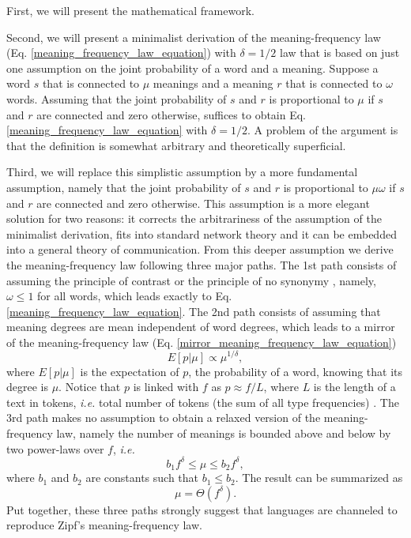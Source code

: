 \documentclass{article}
\begin{document}
First, we will present the mathematical framework. 

Second, we will present a minimalist derivation of the meaning-frequency law (Eq. \ref{meaning_frequency_law_equation}) with $\delta= 1/2$ law that is based on just one assumption on the joint probability of a word and a meaning. Suppose a word $s$ that is connected to $\mu$ meanings and a meaning $r$ that is connected to $\omega$ words.  Assuming that the joint probability of $s$ and $r$ is proportional to $\mu$ if $s$ and $r$ are connected and zero otherwise, suffices to obtain Eq. \ref{meaning_frequency_law_equation} with $\delta = 1/2$. A problem of the argument is that the definition is somewhat arbitrary and theoretically superficial. 

Third, we will replace 
this simplistic assumption by a more fundamental assumption, namely that the joint probability of $s$ and $r$ is proportional to $\mu\omega$ if $s$ and $r$ are connected and zero otherwise. This assumption is a more elegant solution for two reasons: it corrects the arbitrariness of the assumption of the minimalist derivation, fits into standard network theory and it can be embedded into a general theory of communication. From this deeper assumption we derive the meaning-frequency law following three major paths. The 1st path consists of assuming the principle of contrast \cite{Clark1987a} or the principle of no synonymy \cite[p. 67]{Goldberg1995}, namely, $\omega \leq 1$ for all words, which leads exactly to Eq. \ref{meaning_frequency_law_equation}. The 2nd path consists of assuming that meaning degrees are mean independent of word degrees, which leads to a mirror of the meaning-frequency law (Eq. \ref{mirror_meaning_frequency_law_equation}) 
\begin{equation}
E[p|\mu] \propto \mu^{1/\delta}, 
\label{mean_independence_law_equation}
\end{equation}
where $E[p|\mu]$ is the expectation of $p$, the probability of a word, knowing that its degree is $\mu$. Notice that $p$ is linked with $f$ as $p \approx f/L$, where $L$ is the length of a text in tokens, {\em i.e.} total number of tokens (the sum of all type frequencies) \cite{Moreno2016a}. 
The 3rd path makes no assumption to obtain a relaxed version of the meaning-frequency law, namely the number of meanings is bounded above and below by two power-laws over $f$, {\em i.e.} 
\begin{equation*}
b_1 f^\delta \leq \mu \leq b_2 f^\delta,
\end{equation*}
where $b_1$ and $b_2$ are constants such that $b_1 \leq b_2$. The result can be summarized as 
\begin{equation}
\mu =  \Theta(f^\delta).
\label{asymptotic_meaning_frequency_law_equation}
\end{equation}
Put together, these three paths strongly suggest that languages are channeled to reproduce Zipf's meaning-frequency law.
\end{document}
